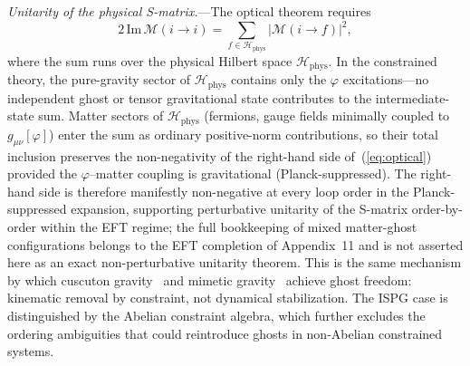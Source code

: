 \documentclass[aps,prd,onecolumn,superscriptaddress,nofootinbib,showpacs,12pt,notitlepage]{revtex4-2}
\begin{document}
\textit{Unitarity of the physical S-matrix.}---The optical
theorem requires
\begin{equation}\label{eq:optical}
  2\,\mathrm{Im}\,\mathcal{M}(i \to i)
  = \sum_{f \in \mathcal{H}_{\mathrm{phys}}}
    |\mathcal{M}(i \to f)|^2,
\end{equation}
where the sum runs over the physical Hilbert space
$\mathcal{H}_{\mathrm{phys}}$.  In the constrained theory, the pure-gravity sector of
$\mathcal{H}_{\mathrm{phys}}$ contains only the $\varphi$
excitations---no independent ghost or tensor gravitational
state contributes to the intermediate-state sum.  Matter
sectors of $\mathcal{H}_{\mathrm{phys}}$ (fermions, gauge
fields minimally coupled to $g_{\mu\nu}[\varphi]$) enter the
sum as ordinary positive-norm contributions, so their total
inclusion preserves the non-negativity of the right-hand side
of~(\ref{eq:optical}) provided the $\varphi$--matter coupling
is gravitational (Planck-suppressed).  The right-hand side is
therefore manifestly non-negative at every loop order in the
Planck-suppressed expansion, supporting perturbative unitarity
of the S-matrix order-by-order within the EFT regime; the full
bookkeeping of mixed matter-ghost configurations belongs to the
EFT completion of Appendix~11 and is not asserted here as an
exact non-perturbative unitarity theorem.  This is the same mechanism by
which cuscuton gravity~\cite{Afshordi2007} and mimetic
gravity~\cite{Chamseddine2013} achieve ghost freedom:
kinematic removal by constraint, not dynamical
stabilization.  The ISPG case is distinguished by the
Abelian constraint algebra, which further excludes the
ordering ambiguities that could reintroduce ghosts in
non-Abelian constrained systems.
\end{document}
